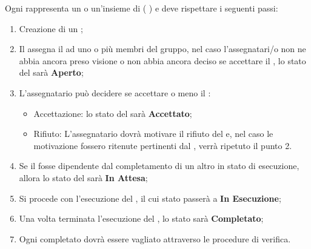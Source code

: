 \documentclass[12pt,a4paper]{article}
\begin{document}
\label{ticketCicloVita}
Ogni  rappresenta un  o un'insieme di  ( ) e deve rispettare i seguenti passi:
\begin{enumerate}
	\item Creazione di un ;
	\item Il \PM{} assegna il  ad uno o più membri del gruppo, nel caso l'assegnatari/o non ne abbia ancora preso visione o non abbia ancora deciso se accettare il , lo stato del  sarà \textbf{Aperto};
	\item L'assegnatario può decidere se accettare o meno il :
	\begin{itemize}
		\item Accettazione: lo stato del  sarà \textbf{Accettato};
		\item Rifiuto: L'assegnatario dovrà motivare il rifiuto del  e, nel caso le motivazione fossero ritenute pertinenti dal \PM{}, verrà ripetuto il punto 2.
	\end{itemize}
	\item Se il  fosse dipendente dal completamento di un altro  in stato di esecuzione, allora lo stato del  sarà \textbf{In Attesa};
	\item Si procede con l'esecuzione del , il cui stato passerà a \textbf{In Esecuzione};
	\item Una volta terminata l'esecuzione del , lo stato sarà \textbf{Completato};
	\item Ogni  completato dovrà essere vagliato attraverso le procedure di verifica.
\end{enumerate}
\end{document}

